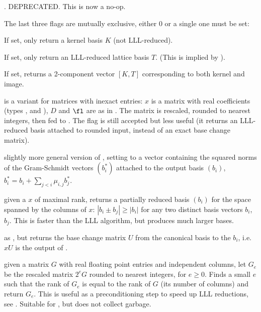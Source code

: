 \item  {}. DEPRECATED. This is now a no-op.

The last three flags are mutually exclusive, either 0 or a single one must be
set:

\item  {} If set, only return a kernel basis $K$ (not LLL-reduced).

\item  {} If set, only return an LLL-reduced lattice basis $T$.
(This is implied by ).

\item  {} If set, returns a 2-component vector $[K, T]$
corresponding to both kernel and image.


 is a variant for matrices
with inexact entries: $x$ is a matrix with real coefficients (types
,  and ), $D$ and $\fl$ are as in .
The matrix is rescaled, rounded to nearest integers, then fed to
. The flag  is still accepted but less useful
(it returns an LLL-reduced basis attached to rounded input, instead of an
exact base change matrix).

 slightly more
general version of , setting  to a vector containing
the squared norms of the Gram-Schmidt vectors $(b_i^*)$ attached to the
output basis $(b_i)$, $b_i^* = b_i + \sum_{j < i} \mu_{i,j} b_j^*$.

 given a  $x$ of maximal rank,
returns a partially reduced basis $(b_i)$ for the space spanned by the
columns of $x$: $|b_i \pm b_j| \geq |b_i|$ for any two distinct basis vectors
$b_i$, $b_j$. This is faster than the LLL algorithm, but produces much larger
bases.

 as , but returns
the base change matrix $U$ from the canonical basis to the $b_i$, i.e. $x U$
is the output of .

 given a matrix $G$ with real floating
point entries and independent columns, let $G_e$ be the
rescaled matrix $2^e G$ rounded to nearest integers, for $e \geq 0$.
Finds a small $e$ such that the rank of $G_e$ is equal to the rank of $G$
(its number of columns) and return $G_e$. This is useful as a preconditioning
step to speed up LLL reductions, see .
Suitable for , but does not collect garbage.


